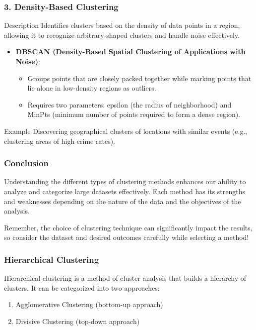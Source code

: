 \documentclass{beamer}
\begin{document}
\begin{frame}[fragile]
    \frametitle{3. Density-Based Clustering}
    \begin{block}{Description}
        Identifies clusters based on the density of data points in a region, allowing it to recognize arbitrary-shaped clusters and handle noise effectively.
    \end{block}

    \begin{itemize}
        \item \textbf{DBSCAN (Density-Based Spatial Clustering of Applications with Noise)}:
            \begin{itemize}
                \item Groups points that are closely packed together while marking points that lie alone in low-density regions as outliers.
                \item Requires two parameters: epsilon (the radius of neighborhood) and MinPts (minimum number of points required to form a dense region).
            \end{itemize}
    \end{itemize}

    \begin{block}{Example}
        Discovering geographical clusters of locations with similar events (e.g., clustering areas of high crime rates).
    \end{block}
\end{frame}

\begin{frame}[fragile]
    \frametitle{Conclusion}
    Understanding the different types of clustering methods enhances our ability to analyze and categorize large datasets effectively. Each method has its strengths and weaknesses depending on the nature of the data and the objectives of the analysis. 

    Remember, the choice of clustering technique can significantly impact the results, so consider the dataset and desired outcomes carefully while selecting a method!
\end{frame}

\begin{frame}[fragile]
    \frametitle{Hierarchical Clustering}
    Hierarchical clustering is a method of cluster analysis that builds a hierarchy of clusters. It can be categorized into two approaches:
    \begin{enumerate}
        \item Agglomerative Clustering (bottom-up approach)
        \item Divisive Clustering (top-down approach)
    \end{enumerate}
\end{frame}
\end{document}
